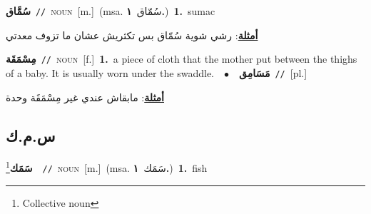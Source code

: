 \documentclass[10pt,a4paper,twoside]{article} %
\begin{document}
\begin{multicols}{2}
{\setlength\topsep{0pt}\textbf{\foreignlanguage{arabic}{سُمَّاق}}\ {\color{gray}\texttt{//}\color{black}}\ \textsc{noun}\ [m.]\ \color{gray}(msa. \foreignlanguage{arabic}{سُمّاق}~\foreignlanguage{arabic}{\textbf{١.}})\color{black}\ \textbf{1.}~sumac\  \begin{flushright}\color{gray}\foreignlanguage{arabic}{\textbf{\underline{\foreignlanguage{arabic}{أمثلة}}}: رشي شوية سُمّاق بس تكثريش عشان ما تزوف معدتي}\end{flushright}\color{black}} \vspace{2mm}

{\setlength\topsep{0pt}\textbf{\foreignlanguage{arabic}{مِسْمَقَة}}\ {\color{gray}\texttt{//}\color{black}}\ \textsc{noun}\ [f.]\ \textbf{1.}~a piece of cloth that the mother put between the thighs of a baby. It is usually worn under the swaddle.\ \ $\bullet$\ \ \setlength\topsep{0pt}\textbf{\foreignlanguage{arabic}{مَسَامِق}}\ {\color{gray}\texttt{//}\color{black}}\ [pl.]\  \begin{flushright}\color{gray}\foreignlanguage{arabic}{\textbf{\underline{\foreignlanguage{arabic}{أمثلة}}}: مابقاش عندي غير مِسْمَقَة وحدة}\end{flushright}\color{black}} \vspace{2mm}

\vspace{-3mm}
\subsection*{\color{blue}\foreignlanguage{arabic}{س.م.ك}\color{blue}{}} 

{\setlength\topsep{0pt}\textbf{\foreignlanguage{arabic}{سَمَك}}\footnote{Collective noun}\ \ {\color{gray}\texttt{//}\color{black}}\ \textsc{noun}\ [m.]\ \color{gray}(msa. \foreignlanguage{arabic}{سَمَك}~\foreignlanguage{arabic}{\textbf{١.}})\color{black}\ \textbf{1.}~fish\ } \vspace{2mm}


\end{multicols}
\end{document}
